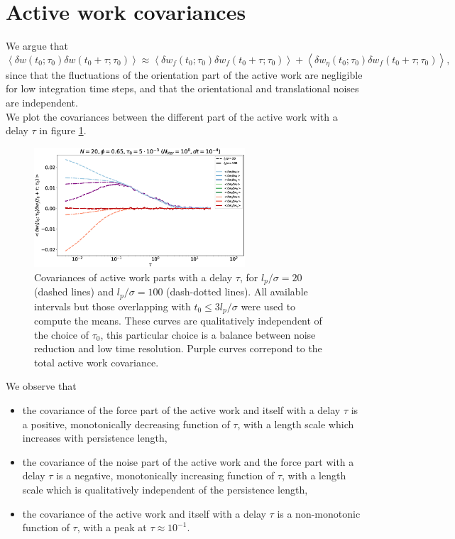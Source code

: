 \documentclass[10pt]{article}
\begin{document}
\section{Active work covariances}

We argue that
\begin{equation}
\left<\delta w(t_0; \tau_0) \delta w(t_0 + \tau; \tau_0)\right> \approx \left<\delta w_f(t_0; \tau_0) \delta w_f(t_0 + \tau; \tau_0)\right> + \left<\delta w_{\eta}(t_0; \tau_0) \delta w_f(t_0 + \tau; \tau_0)\right>,
\end{equation}
since that the fluctuations of the orientation part of the active work are negligible for low integration time steps, and that the orientational and translational noises are independent.\\

We plot the covariances between the different part of the active work with a delay $\tau$ in figure \ref{crossCor}.

\begin{figure}[H]
\centering
\includegraphics[width=0.7\textwidth]{crossCor_Nm2000_Dk6500_En1000.eps}
\caption{Covariances of active work parts with a delay $\tau$, for $l_p/\sigma = 20$ (dashed lines) and $l_p/\sigma = 100$ (dash-dotted lines). All available intervals but those overlapping with $t_0 \leq 3 l_p/\sigma$ were used to compute the means. These curves are qualitatively independent of the choice of $\tau_0$, this particular choice is a balance between noise reduction and low time resolution. Purple curves correpond to the total active work covariance.}
\label{crossCor}
\end{figure}

We observe that
\begin{itemize}
  \item the covariance of the force part of the active work and itself with a delay $\tau$ is a positive, monotonically decreasing function of $\tau$, with a length scale which increases with persistence length,
  \item the covariance of the noise part of the active work and the force part with a delay $\tau$ is a negative, monotonically increasing function of $\tau$, with a length scale which is qualitatively independent of the persistence length,
  \item the covariance of the active work and itself with a delay $\tau$ is a non-monotonic function of $\tau$, with a peak at $\tau \approx 10^{-1}$.
\end{itemize}
\end{document}
